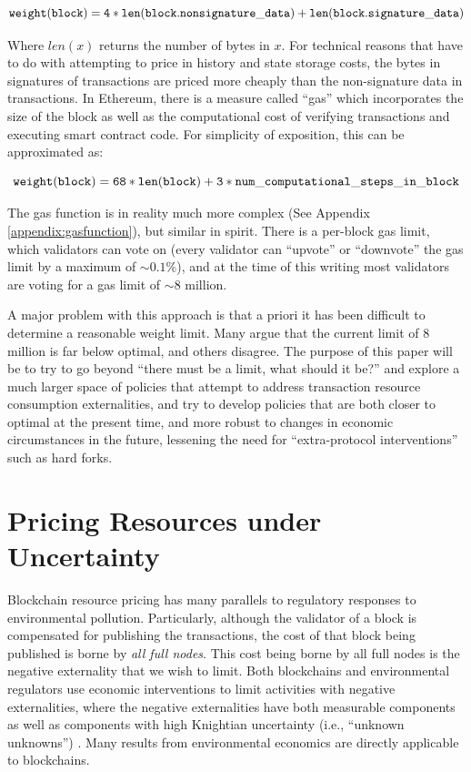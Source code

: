 \documentclass[12pt, final]{article}
\begin{document}
\begin{equation}
\tt{weight(block) = 4 * len(block.nonsignature\_data) + len(block.signature\_data)}
\end{equation}

Where $len(x)$ returns the number of bytes in $x$. For technical reasons that have to do with attempting to price in history and state storage costs, the bytes in signatures of transactions are priced more cheaply than the non-signature data in transactions. In Ethereum, there is a measure called ``gas'' which incorporates the size of the block as well as the computational cost of verifying transactions and executing smart contract code. For simplicity of exposition, this can be approximated as:

\begin{equation}
\tt{weight(block) = 68 * len(block) + 3 * num\_computational\_steps\_in\_block}
\end{equation}

The gas function is in reality much more complex (See Appendix \ref{appendix:gasfunction}), but similar in spirit. There is a per-block gas limit, which validators can vote on (every validator can ``upvote'' or ``downvote'' the gas limit by a maximum of $\sim\!0.1\%$), and at the time of this writing most validators are voting for a gas limit of $\sim \! 8$ million.

A major problem with this approach is that a priori it has been difficult to determine a reasonable weight limit. Many argue that the current limit of $8$ million is far below optimal, and others disagree. The purpose of this paper will be to try to go beyond ``there must be a limit, what should it be?'' and explore a much larger space of policies that attempt to address transaction resource consumption externalities, and try to develop policies that are both closer to optimal at the present time, and more robust to changes in economic circumstances in the future, lessening the need for ``extra-protocol interventions'' such as hard forks.

\section{Pricing Resources under Uncertainty}
\label{sect:uncertainty}
Blockchain resource pricing has many parallels to regulatory responses to environmental pollution.  Particularly, although the validator of a block is compensated for publishing the transactions, the cost of that block being published is borne by \emph{all full nodes}.  This cost being borne by all full nodes is the negative externality that we wish to limit.  Both blockchains and environmental regulators use economic interventions to limit activities with negative externalities, where the negative externalities have both measurable components as well as components with high Knightian uncertainty (i.e., ``unknown unknowns'') \cite{knight1921risk}.  Many results from environmental economics \cite{barder14} are directly applicable to blockchains.
\end{document}
